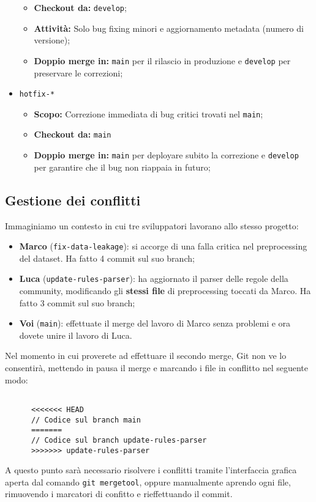 \documentclass[12pt]{article}
\begin{document}
\begin{itemize}
\begin{itemize}
          \item \textbf{Checkout da:} \texttt{develop};
          \item \textbf{Attività:} Solo bug fixing minori e aggiornamento metadata (numero di versione);
          \item \textbf{Doppio merge in:} \texttt{main} per il rilascio in produzione e \texttt{develop} per preservare le correzioni;
        \end{itemize}
      \item \texttt{hotfix-*}
        \begin{itemize}
          \item \textbf{Scopo:} Correzione immediata di bug critici trovati nel \texttt{main};
          \item \textbf{Checkout da:} \texttt{main}
          \item \textbf{Doppio merge in:} \texttt{main} per deployare subito la correzione e \texttt{develop} per garantire che il bug non riappaia in futuro;
        \end{itemize}
    \end{itemize}

    \newpage
    \subsection{Gestione dei conflitti}
    Immaginiamo un contesto in cui tre sviluppatori lavorano allo stesso progetto:
    \begin{itemize}
      \item \textbf{Marco} (\texttt{fix-data-leakage}): si accorge di una falla critica nel preprocessing del dataset. Ha fatto 4 commit sul suo branch;
      \item \textbf{Luca} (\texttt{update-rules-parser}): ha aggiornato il parser delle regole della community, modificando gli \textbf{stessi file} di preprocessing toccati da Marco. Ha fatto 3 commit sul suo branch;
      \item \textbf{Voi} (\texttt{main}): effettuate il merge del lavoro di Marco senza problemi e ora dovete unire il lavoro di Luca.
    \end{itemize}
    Nel momento in cui proverete ad effettuare il secondo merge, Git non ve lo consentirà, mettendo in pausa il merge e marcando i file in conflitto nel seguente modo:
    \begin{lstlisting}

      <<<<<<< HEAD
      // Codice sul branch main
      =======
      // Codice sul branch update-rules-parser
      >>>>>>> update-rules-parser
    \end{lstlisting}
    A questo punto sarà necessario risolvere i conflitti tramite l'interfaccia grafica aperta dal comando \texttt{git mergetool},
    oppure manualmente aprendo ogni file, rimuovendo i marcatori di confitto e rieffettuando il commit.
\end{document}
